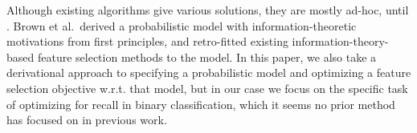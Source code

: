 Although existing algorithms give various solutions, they are mostly
ad-hoc, until \cite{brown2012conditional}. Brown et al.\ derived a 
probabilistic model with information-theoretic motivations from first principles, and retro-fitted
existing information-theory-based feature selection methods to the
model. In this paper, we also take a derivational approach to
specifying a probabilistic model and optimizing a feature selection
objective w.r.t. that model, but in our case we focus on the specific
task of optimizing for recall in binary classification, which it 
seems no prior method has focused on in previous work.


